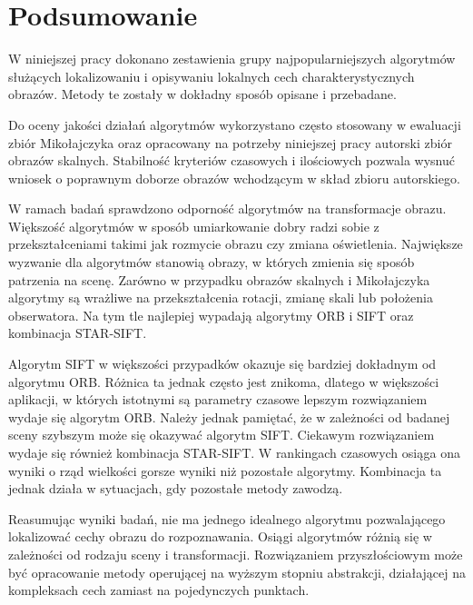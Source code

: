 \chapter{Podsumowanie}
W niniejszej pracy dokonano zestawienia grupy najpopularniejszych algorytmów służących lokalizowaniu i opisywaniu lokalnych cech charakterystycznych obrazów. Metody te zostały w dokładny sposób opisane i przebadane.

Do oceny jakości działań algorytmów wykorzystano często stosowany w ewaluacji zbiór Mikołajczyka oraz opracowany na potrzeby niniejszej pracy autorski zbiór obrazów skalnych. Stabilność kryteriów czasowych i ilościowych pozwala wysnuć wniosek o poprawnym doborze obrazów wchodzącym w skład zbioru autorskiego.

W ramach badań sprawdzono odporność algorytmów na transformacje obrazu. Większość algorytmów w sposób umiarkowanie dobry radzi sobie z przekształceniami takimi jak rozmycie obrazu czy zmiana oświetlenia. Największe wyzwanie dla algorytmów stanowią obrazy, w których zmienia się sposób patrzenia na scenę. Zarówno w przypadku obrazów skalnych i Mikołajczyka algorytmy są wrażliwe na przekształcenia rotacji, zmianę skali lub położenia obserwatora. Na tym tle najlepiej wypadają algorytmy ORB i SIFT oraz kombinacja STAR-SIFT.

Algorytm SIFT w większości przypadków okazuje się bardziej dokładnym od algorytmu ORB. Różnica ta jednak często jest znikoma, dlatego w większości aplikacji, w których istotnymi są parametry czasowe lepszym rozwiązaniem wydaje się algorytm ORB. Należy jednak pamiętać, że w zależności od badanej sceny szybszym może się okazywać algorytm SIFT. Ciekawym rozwiązaniem wydaje się również kombinacja STAR-SIFT. W rankingach czasowych osiąga ona wyniki o rząd wielkości gorsze wyniki niż pozostałe algorytmy. Kombinacja ta jednak działa w sytuacjach, gdy pozostałe metody zawodzą.

Reasumując wyniki badań, nie ma jednego idealnego algorytmu pozwalającego lokalizować cechy obrazu do rozpoznawania. Osiągi algorytmów różnią się w zależności od rodzaju sceny i transformacji. Rozwiązaniem przyszłościowym może być opracowanie metody operującej na wyższym stopniu abstrakcji, działającej na kompleksach cech zamiast na pojedynczych punktach.